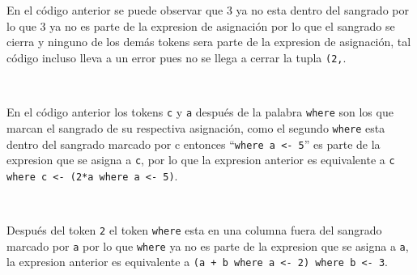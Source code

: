       \begin{fxcode}
         \\
         \\
      \end{fxcode}
      
      En el código anterior se puede observar que 3 ya no esta dentro del sangrado por lo que 3 ya no es parte de la expresion de asignación por lo que el sangrado se cierra y ninguno de los demás tokens sera parte de la expresion de asignación, tal código incluso lleva a un error pues no se llega a cerrar la tupla \texttt{(2,}.
      
      \begin{fxcode}
         \\
      \end{fxcode}
      
      \begin{fxcode}
      \end{fxcode}
      
      En el código anterior los tokens \texttt{c} y \texttt{a} después de la palabra \texttt{where} son los que marcan el sangrado de su respectiva asignación, como el segundo \texttt{where} esta dentro del sangrado marcado por c entonces ``\texttt{where a~<- 5}'' es parte de la expresion que se asigna a \texttt{c}, por lo que la expresion anterior es equivalente a \texttt{c where c~<- (2*a where a~<- 5)}.
   
      \begin{fxcode}
         \\
      \end{fxcode}
      
      Después del token \texttt{2} el token \texttt{where} esta en una columna fuera del sangrado marcado por \texttt{a} por lo que \texttt{where} ya no es parte de la expresion que se asigna a \texttt{a}, la expresion anterior es equivalente a \texttt{(a + b where a~<- 2) where b~<- 3}.
      
      \begin{fxcode}
         \\
          
      \end{fxcode}
      
      
      
      
      
      
      
      
      
      
      
      